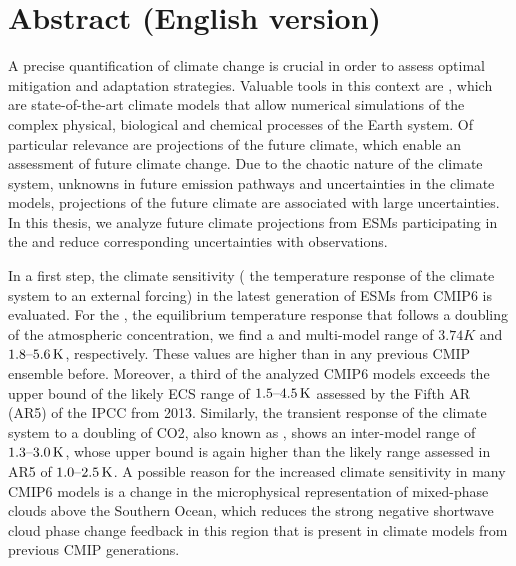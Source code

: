 


\chapter*{Abstract (English version)}

A precise quantification of climate change is crucial in order to assess
optimal mitigation and adaptation strategies. Valuable tools in this context
are , which are state-of-the-art climate models that allow
numerical simulations of the complex physical, biological and chemical
processes of the Earth system. Of particular relevance are projections of the
future climate, which enable an assessment of future climate change. Due to the
chaotic nature of the climate system, unknowns in future emission pathways and
uncertainties in the climate models, projections of the future climate are
associated with large uncertainties. In this thesis, we analyze future climate
projections from \acsp{ESM} participating in the  and reduce
corresponding uncertainties with observations.

In a first step, the climate sensitivity (\ie{} the temperature response of the
climate system to an external forcing) in the latest generation of \acsp{ESM}
from \acs{CMIP}6 is evaluated. For the , the equilibrium
temperature response that follows a doubling of the atmospheric
 concentration, we find a  and multi-model
range of $3.74 \unit{K}$ and $\rangeunit{1.8}{5.6}{K}$, respectively. These
values are higher than in any previous \acs{CMIP} ensemble before. Moreover, a
third of the analyzed \acs{CMIP}6 models exceeds the upper bound of the likely
\acs{ECS} range of $\rangeunit{1.5}{4.5}{K}$ assessed by the Fifth \acl{AR}
(\acs{AR}5) of the \acl{IPCC} from 2013. Similarly, the transient response of
the climate system to a doubling of \acs{CO2}, also known as ,
shows an inter-model range of $\rangeunit{1.3}{3.0}{K}$, whose upper bound is
again higher than the likely range assessed in \acs{AR}5 of
$\rangeunit{1.0}{2.5}{K}$. A possible reason for the increased climate
sensitivity in many \acs{CMIP}6 models is a change in the microphysical
representation of mixed-phase clouds above the Southern Ocean, which reduces
the strong negative shortwave cloud phase change feedback in this region that
is present in climate models from previous \acs{CMIP} generations.

